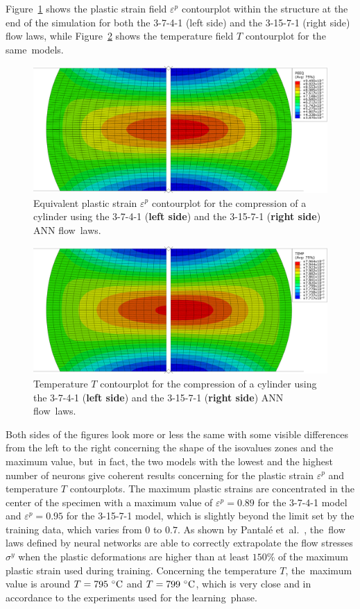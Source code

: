 \documentclass[algorithms,article,accept,pdftex,oneauthors]{Definitions/mdpi}
\begin{document}
Figure~\ref{fig:peeqContourplot} shows the plastic strain field $\varepsilon^p$ contourplot within the structure at the end of the simulation for both the 3-7-4-1 (left side) and the 3-15-7-1 (right side) flow laws, while Figure~\ref{fig:dpeeqContourplot} shows the temperature field $T$ contourplot for the same~models.
\begin{figure}[H]
\includegraphics[width=0.90\columnwidth]{Figures/peeq}
\caption{{Equivalent plastic} %
 strain $\varepsilon^p$ contourplot for the compression of a cylinder using the 3-7-4-1 (\textbf{left side}) and the 3-15-7-1 (\textbf{right side}) ANN flow~laws.}
\label{fig:peeqContourplot}
\end{figure}
\unskip
\begin{figure}[H]
\includegraphics[width=0.90\columnwidth]{Figures/temp}
\caption{{Temperature} %
 $T$ contourplot for the compression of a cylinder using the 3-7-4-1 (\textbf{left side}) and the 3-15-7-1 (\textbf{right side}) ANN flow~laws.}
\label{fig:dpeeqContourplot}
\end{figure}
Both sides of the figures look more or less the same with some visible differences from the left to the right concerning the shape of the isovalues zones and the maximum value, but~in fact, the two models with the lowest and the highest number of neurons give coherent results concerning for the plastic strain $\varepsilon^p$ and temperature $T$ contourplots.
The maximum plastic strains are concentrated in the center of the specimen with a maximum value of $\varepsilon^p=0.89$ for the 3-7-4-1 model and $\varepsilon^p=0.95$ for the 3-15-7-1 model, which is slightly beyond the limit set by the training data, which varies from $0$ to $0.7$.
As shown by Pantalé et~al.~\cite{Pantale-2021}, the~flow laws defined by neural networks are able to correctly extrapolate the flow stresses $\sigma^y$ when the plastic deformations are higher than at least $150\%$ of the maximum plastic strain used during training.
Concerning the temperature $T$, the~maximum value is around $T=795~\celsius$ and $T=799~\celsius$, which is very close and in accordance to the experiments used for the learning~phase.
\end{document}
